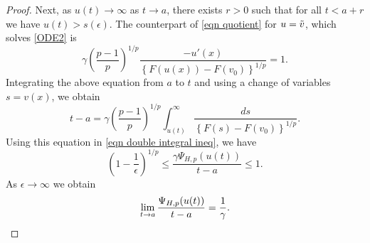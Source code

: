 \documentclass[10pt,a4paper]{amsart}
\begin{document}
\begin{proof}
   Next, as $u(t)\to \infty$ as $t\to a$, there exists $r>0$ such that for all $t<a+r$ we have $u(t)>s(\epsilon)$. The counterpart of \eqref{eqn quotient} for $u=\Tilde{v}$, which solves \eqref{ODE2} is 
   \begin{equation*}
       \gamma\left(\frac{p-1}{p}\right)^{1/p}\frac{-u'(x)}{\left\{F\left(u(x)\right)-F(v_{0})\right\}^{1/p}}=1.
   \end{equation*}
   Integrating the above equation from $a$ to $t$ and using a change of variables $s=v(x)$, we obtain  
   \begin{equation*}
       t-a=\gamma\left(\frac{p-1}{p}\right)^{1/p}\int_{u(t)}^{\infty}\frac{ds}{\left\{F(s)-F(v_{0})\right\}^{1/p}}.
   \end{equation*}
   Using this equation in \eqref{eqn double integral ineq}, we have 
    \begin{equation*}
       \left(1-\frac{1}{\epsilon}\right)^{1/p}\leq \frac{\gamma\Psi_{H,p}(u(t))}{t-a}\leq 1.
   \end{equation*}
   As $\epsilon\to \infty$ we obtain 
   \begin{equation*}
       \lim_{t\to a}\frac{\Psi_{H,p}(u(t))}{t-a}=\frac{1}{\gamma}.\qedhere
   \end{equation*}
\end{proof}
\end{document}
